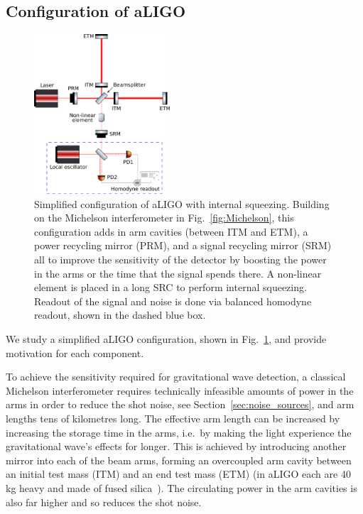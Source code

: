 \documentclass[aps,pra,superscriptaddress,reprint,nofootinbib]{revtex4-1}
\begin{document}
\subsection{Configuration of aLIGO}

\begin{figure}[ht]
	\begin{center}
	\includegraphics[width=0.45\textwidth]{figures/aLIGO_internal_squeezing.pdf}
	\end{center}
	\caption{Simplified configuration of aLIGO with internal squeezing. Building on the Michelson interferometer in Fig.~\ref{fig:Michelson}, this configuration adds in arm cavities (between ITM and ETM), a power recycling mirror (PRM), and a signal recycling mirror (SRM) all to improve the sensitivity of the detector by boosting the power in the arms or the time that the signal spends there. A non-linear element is placed in a long SRC to perform internal squeezing. Readout of the signal and noise is done via balanced homodyne readout, shown in the dashed blue box.}
	\label{fig:aLIGO_configuration}
\end{figure}

We study a simplified aLIGO configuration, shown in Fig.~\ref{fig:aLIGO_configuration}, and provide motivation for each component.


To achieve the sensitivity required for gravitational wave detection, a classical Michelson interferometer requires technically infeasible amounts of power in the arms in order to reduce the shot noise, see Section~\ref{sec:noise_sources}, and arm lengths tens of kilometres long.
The effective arm length can be increased by increasing the storage time in the arms, i.e.\ by making the light experience the gravitational wave’s effects for longer. This is achieved by introducing another mirror into each of the beam arms, forming an overcoupled arm cavity between an initial test mass (ITM) and an end test mass (ETM) (in aLIGO each are 40 kg heavy and made of fused silica~\cite{AdvancedLIGO:2015}). The circulating power in the arm cavities is also far higher and so reduces the shot noise.
\end{document}

